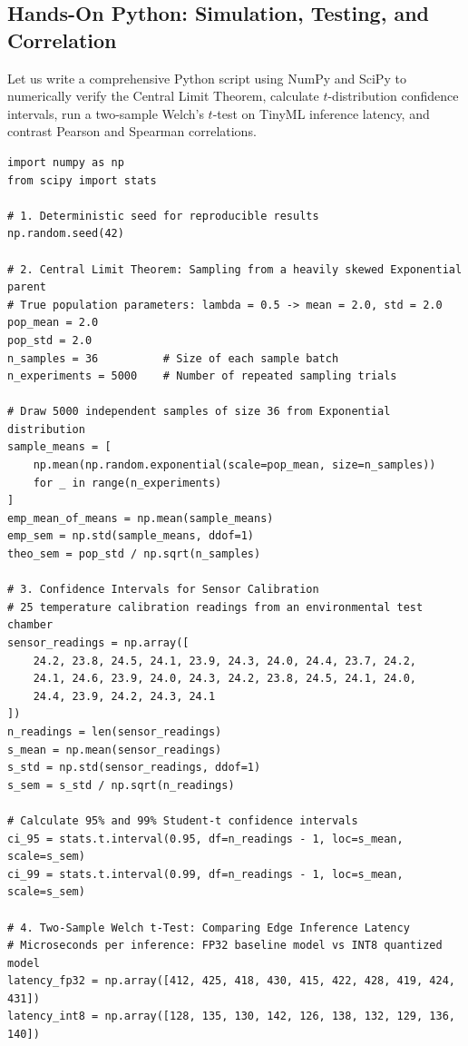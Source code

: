 \subsection{Hands-On Python: Simulation, Testing, and Correlation}\label{subsec:stat_python}

Let us write a comprehensive Python script using NumPy and SciPy to numerically verify the Central Limit Theorem, calculate $t$-distribution confidence intervals, run a two-sample Welch's $t$-test on TinyML inference latency, and contrast Pearson and Spearman correlations.

\begin{lstlisting}[style=pythonstyle]
import numpy as np
from scipy import stats

# 1. Deterministic seed for reproducible results
np.random.seed(42)

# 2. Central Limit Theorem: Sampling from a heavily skewed Exponential parent
# True population parameters: lambda = 0.5 -> mean = 2.0, std = 2.0
pop_mean = 2.0
pop_std = 2.0
n_samples = 36          # Size of each sample batch
n_experiments = 5000    # Number of repeated sampling trials

# Draw 5000 independent samples of size 36 from Exponential distribution
sample_means = [
    np.mean(np.random.exponential(scale=pop_mean, size=n_samples)) 
    for _ in range(n_experiments)
]
emp_mean_of_means = np.mean(sample_means)
emp_sem = np.std(sample_means, ddof=1)
theo_sem = pop_std / np.sqrt(n_samples)

# 3. Confidence Intervals for Sensor Calibration
# 25 temperature calibration readings from an environmental test chamber
sensor_readings = np.array([
    24.2, 23.8, 24.5, 24.1, 23.9, 24.3, 24.0, 24.4, 23.7, 24.2,
    24.1, 24.6, 23.9, 24.0, 24.3, 24.2, 23.8, 24.5, 24.1, 24.0,
    24.4, 23.9, 24.2, 24.3, 24.1
])
n_readings = len(sensor_readings)
s_mean = np.mean(sensor_readings)
s_std = np.std(sensor_readings, ddof=1)
s_sem = s_std / np.sqrt(n_readings)

# Calculate 95% and 99% Student-t confidence intervals
ci_95 = stats.t.interval(0.95, df=n_readings - 1, loc=s_mean, scale=s_sem)
ci_99 = stats.t.interval(0.99, df=n_readings - 1, loc=s_mean, scale=s_sem)

# 4. Two-Sample Welch t-Test: Comparing Edge Inference Latency
# Microseconds per inference: FP32 baseline model vs INT8 quantized model
latency_fp32 = np.array([412, 425, 418, 430, 415, 422, 428, 419, 424, 431])
latency_int8 = np.array([128, 135, 130, 142, 126, 138, 132, 129, 136, 140])


\end{lstlisting}
